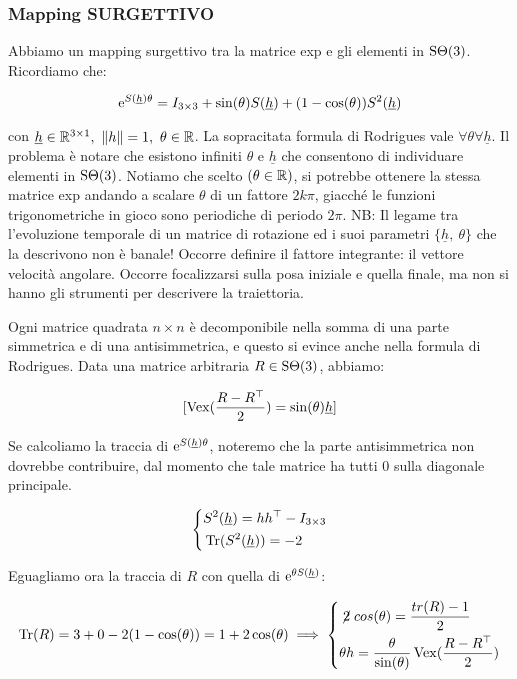 \subsubsection{Mapping SURGETTIVO}

Abbiamo un mapping surgettivo tra la matrice exp e gli elementi in $\operatorname{S\Theta}(3)$. Ricordiamo che:

\[
	\mathop{}\!\mathrm{e}^{S(\underline{h})\theta} = I_{3\times 3} + \sin(\theta)S(\underline{h}) + (1-\cos(\theta))S^2(\underline{h})
\]

con $\underline{h}\in\R^{3\times 1},\ \norma{h}=1,\ \theta\in\R$. La sopracitata formula di Rodrigues vale $\forall\theta\forall \underline{h}$. Il problema è notare che esistono infiniti $\theta$ e $\underline{h}$ che consentono di individuare elementi in $\operatorname{S\Theta}(3)$. Notiamo che scelto $(\theta\in\mathbb{R})$, si potrebbe ottenere la stessa matrice exp andando a scalare $\theta$ di un fattore $2k\pi$, giacché le funzioni trigonometriche in gioco sono periodiche di periodo $2\pi$. NB: Il legame tra l'evoluzione temporale di un matrice di rotazione ed i suoi parametri $\{\underline{h},\ \theta\}$ che la descrivono non è banale! Occorre definire il fattore integrante: il vettore velocità angolare. Occorre focalizzarsi sulla posa iniziale e quella finale, ma non si hanno gli strumenti per descrivere la traiettoria.

Ogni matrice quadrata $n\times n$ è decomponibile nella somma di una parte simmetrica e di una antisimmetrica, e questo si evince anche nella formula di Rodrigues. Data una matrice arbitraria $R\in\operatorname{S\Theta}(3)$, abbiamo:

\[
	[\operatorname{Vex}(\frac{R-R^\top}{2}) = \sin(\theta)\underline{h}]
\]

Se calcoliamo la traccia di $\mathop{}\!\mathrm{e}^{S(\underline{h})\theta}$, noteremo che la parte antisimmetrica non dovrebbe contribuire, dal momento che tale matrice ha tutti 0 sulla diagonale principale.

\[
	\left\{
	\begin{aligned}
	&S^2(\underline{h}) = hh^\top - I_{3\times 3}\\
	&\operatorname{Tr}(S^2(\underline{h})) = -2
	\end{aligned}
	\right.
\]

Eguagliamo ora la traccia di $R$ con quella di $\mathop{}\!\mathrm{e}^{\theta S(\underline{h})}$:

\[
	\Tr(R) = 3 + 0 -2(1-\cos(\theta)) = 1+2\cos(\theta) \implies
	\left\{
	\begin{aligned}
	&\centernot{2}cos(\theta) = \frac{tr(R)-1}{2}\\
	&\theta h = \frac{\theta}{\sin(\theta)} \Vex(\frac{R-R^\top}{2})
	\end{aligned}
	\right.
\]

